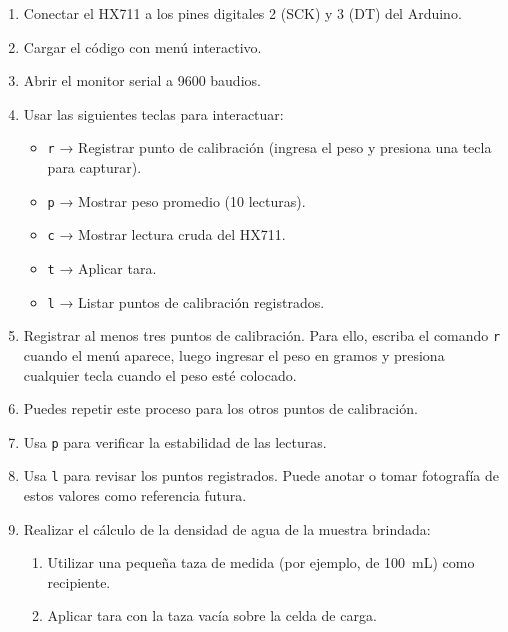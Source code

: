 \pro
\begin{enumerate}
  \item Conectar el HX711 a los pines digitales 2 (SCK) y 3 (DT) del Arduino.
  \item Cargar el código con menú interactivo.
  \item Abrir el monitor serial a 9600 baudios.
  \item Usar las siguientes teclas para interactuar:
  
    \begin{itemize}
      \item \texttt{r} → Registrar punto de calibración (ingresa el peso y presiona una tecla para capturar).
      \item \texttt{p} → Mostrar peso promedio (10 lecturas).
      \item \texttt{c} → Mostrar lectura cruda del HX711.
      \item \texttt{t} → Aplicar tara.
      \item \texttt{l} → Listar puntos de calibración registrados.
    \end{itemize}
    
  \item Registrar al menos tres puntos de calibración. Para ello,  escriba el comando \texttt{r} cuando el menú aparece, luego ingresar el peso en gramos y presiona cualquier tecla cuando el peso esté colocado.

  \item Puedes repetir este proceso para los otros puntos de calibración.
  
  \item Usa \texttt{p} para verificar la estabilidad de las lecturas.
  
  \item Usa \texttt{l} para revisar los puntos registrados. Puede anotar o tomar fotografía de estos valores como referencia futura.
  


\item Realizar el cálculo de la densidad de agua de la muestra brindada:

  \begin{enumerate}

    \item Utilizar una pequeña taza de medida (por ejemplo, de \SI{100}{\milli\liter}) como recipiente.
  
    \item Aplicar tara con la taza vacía sobre la celda de carga.
  

\end{enumerate}
\end{enumerate}

